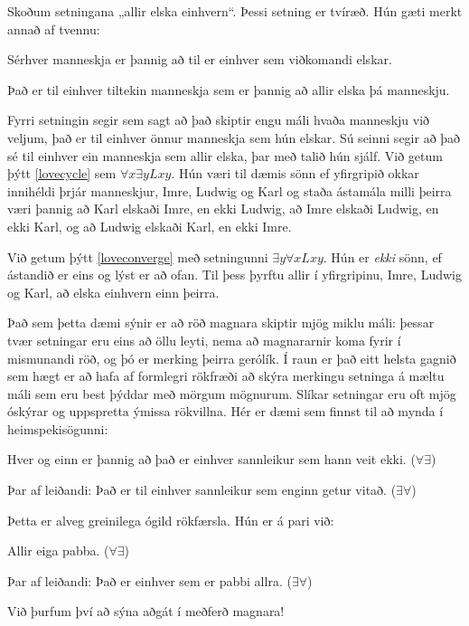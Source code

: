 Skoðum setningana „allir elska einhvern“. Þessi setning er tvíræð. Hún gæti merkt annað af tvennu:
	\begin{earg}
		\item[\ex{lovecycle}] Sérhver manneskja er þannig að til er einhver sem viðkomandi elskar. 
		\item[\ex{loveconverge}] Það er til einhver tiltekin manneskja sem er þannig að allir elska þá manneskju.
	\end{earg}
Fyrri setningin segir sem sagt að það skiptir engu máli hvaða manneskju við veljum, það er til einhver önnur manneskja sem hún elskar. Sú seinni segir að það sé til einhver ein manneskja sem allir elska, þar með talið hún sjálf. Við getum þýtt \ref{lovecycle} sem $\forall x \exists y Lxy$. Hún væri til dæmis sönn ef yfirgripið okkar innihéldi þrjár manneskjur, Imre, Ludwig og Karl og staða ástamála milli þeirra væri þannig að Karl elskaði Imre, en ekki Ludwig, að Imre elskaði Ludwig, en ekki Karl, og að Ludwig elskaði Karl, en ekki Imre. 

Við getum þýtt \ref{loveconverge} með setningunni $\exists y \forall x Lxy$. Hún er \emph{ekki} sönn, ef ástandið er eins og lýst er að ofan. Til þess þyrftu allir í yfirgripinu, Imre, Ludwig og Karl, að elska einhvern einn þeirra. 

Það sem þetta dæmi sýnir er að röð magnara skiptir mjög miklu máli: þessar tvær setningar eru eins að öllu leyti, nema að magnararnir koma fyrir í mismunandi röð, og þó er merking þeirra gerólík. Í raun er það eitt helsta gagnið sem hægt er að hafa af formlegri rökfræði að skýra merkingu setninga á mæltu máli sem eru best þýddar með mörgum mögnurum. Slíkar setningar eru oft mjög óskýrar og uppspretta ýmissa rökvillna. Hér er dæmi sem finnst til að mynda í heimspekisögunni:

	\begin{earg}
		\item[] Hver og einn er þannig að það er einhver sannleikur sem hann veit ekki. \hfill ($\forall \exists$)
		\item[Þar af leiðandi:] Það er til einhver sannleikur sem enginn getur vitað. \hfill ($\exists \forall$)
	\end{earg}
Þetta er alveg greinilega ógild rökfærsla. Hún er á pari við:
	\begin{earg}
		\item[] Allir eiga pabba. \hfill ($\forall \exists$)
		\item[Þar af leiðandi:] Það er einhver sem er pabbi allra. \hfill ($\exists \forall$)
	\end{earg}
Við þurfum því að sýna aðgát í meðferð magnara!	

